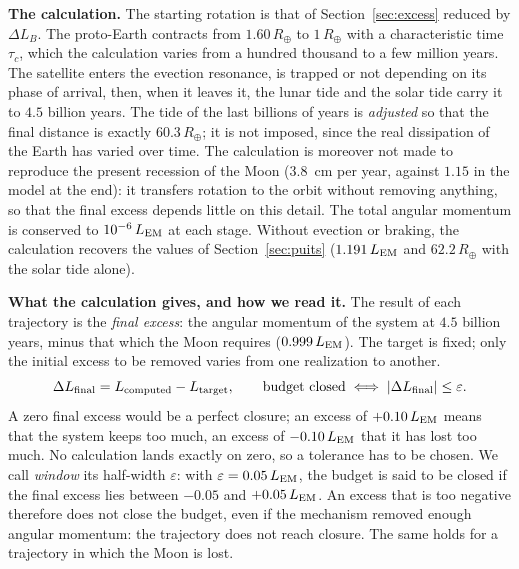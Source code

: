 \documentclass[11pt,a4paper]{article}
\newcommand{\Rt}{\ensuremath{R_\oplus}}
\newcommand{\LEM}{\ensuremath{L_{\rm EM}}}
\begin{document}
\textbf{The calculation.} The starting rotation is that of Section~\ref{sec:excess} reduced by $\Delta L_B$. The proto-Earth contracts from $1.60\,\Rt$ to $1\,\Rt$ with a characteristic time $\tau_c$, which the calculation varies from a hundred thousand to a few million years. The satellite enters the evection resonance, is trapped or not depending on its phase of arrival, then, when it leaves it, the lunar tide and the solar tide carry it to $4.5$ billion years. The tide of the last billions of years is \emph{adjusted} so that the final distance is exactly $60.3\,\Rt$; it is not imposed, since the real dissipation of the Earth has varied over time. The calculation is moreover not made to reproduce the present recession of the Moon ($3.8$~cm per year, against $1.15$ in the model at the end): it transfers rotation to the orbit without removing anything, so that the final excess depends little on this detail. The total angular momentum is conserved to $10^{-6}\,\LEM$ at each stage. Without evection or braking, the calculation recovers the values of Section~\ref{sec:puits} ($1.191\,\LEM$ and $62.2\,\Rt$ with the solar tide alone).

\textbf{What the calculation gives, and how we read it.} The result of each trajectory is the \emph{final excess}: the angular momentum of the system at $4.5$ billion years, minus that which the Moon requires ($0.999\,\LEM$). The target is fixed; only the initial excess to be removed varies from one realization to another.
\[
\Delta L_{\rm final}=L_{\rm computed}-L_{\rm target},
\qquad
\text{budget closed}\iff|\Delta L_{\rm final}|\le\varepsilon .
\]
A zero final excess would be a perfect closure; an excess of $+0.10\,\LEM$ means that the system keeps too much, an excess of $-0.10\,\LEM$ that it has lost too much. No calculation lands exactly on zero, so a tolerance has to be chosen. We call \emph{window} its half-width $\varepsilon$: with $\varepsilon=0.05\,\LEM$, the budget is said to be closed if the final excess lies between $-0.05$ and $+0.05\,\LEM$. An excess that is too negative therefore does not close the budget, even if the mechanism removed enough angular momentum: the trajectory does not reach closure. The same holds for a trajectory in which the Moon is lost.
\end{document}
